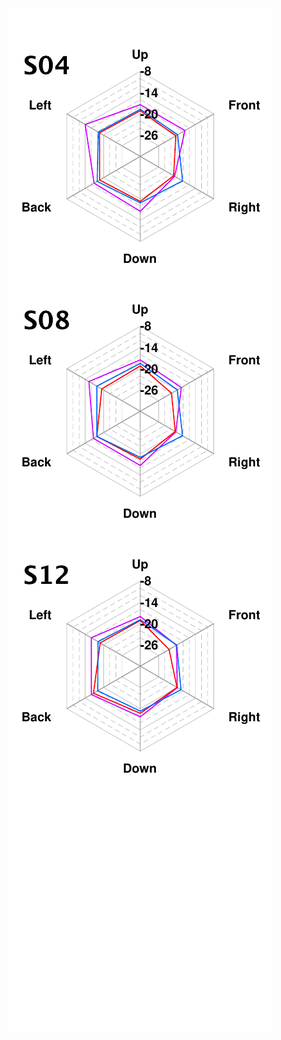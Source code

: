 \documentclass[11pt,a4j]{jreport}
\begin{document}
\begin{figure}[H]
\begin{minipage}{.5\linewidth}
        \includegraphics[scale=.77]{images/realHallDirSt/allPoint/reshaped/fLeftPage.pdf}
    \end{minipage}
\end{figure}
\end{document}
